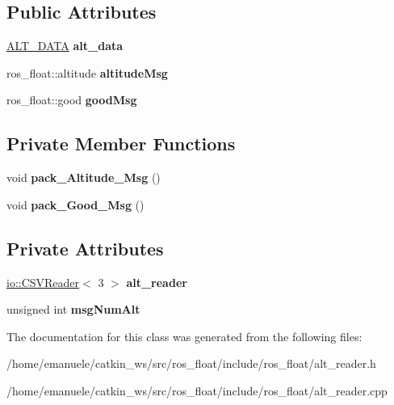 \subsection*{Public Attributes}
\begin{DoxyCompactItemize}
\item 
\mbox{\label{classALT__reader_aacaf9a8c099acd10dd53a54ccf564474}} 
\hyperlink{structALT__DATA}{A\+L\+T\+\_\+\+D\+A\+TA} {\bfseries alt\+\_\+data}
\item 
\mbox{\label{classALT__reader_a4aac4f3940c04b29d253b10b9e3549e2}} 
ros\+\_\+float\+::altitude {\bfseries altitude\+Msg}
\item 
\mbox{\label{classALT__reader_a9d872dde321d76b2c95a31904b05d2ce}} 
ros\+\_\+float\+::good {\bfseries good\+Msg}
\end{DoxyCompactItemize}
\subsection*{Private Member Functions}
\begin{DoxyCompactItemize}
\item 
\mbox{\label{classALT__reader_a99f7700211409858f0989be46f13fb3d}} 
void {\bfseries pack\+\_\+\+Altitude\+\_\+\+Msg} ()
\item 
\mbox{\label{classALT__reader_ae28a3371b576983838ea727537967320}} 
void {\bfseries pack\+\_\+\+Good\+\_\+\+Msg} ()
\end{DoxyCompactItemize}
\subsection*{Private Attributes}
\begin{DoxyCompactItemize}
\item 
\mbox{\label{classALT__reader_afd2086e0508a80c7c409571b9dbf3449}} 
\hyperlink{classio_1_1CSVReader}{io\+::\+C\+S\+V\+Reader}$<$ 3 $>$ {\bfseries alt\+\_\+reader}
\item 
\mbox{\label{classALT__reader_a9086f22999868ee6843955edcd23c708}} 
unsigned int {\bfseries msg\+Num\+Alt}
\end{DoxyCompactItemize}


The documentation for this class was generated from the following files\+:\begin{DoxyCompactItemize}
\item 
/home/emanuele/catkin\+\_\+ws/src/ros\+\_\+float/include/ros\+\_\+float/alt\+\_\+reader.\+h\item 
/home/emanuele/catkin\+\_\+ws/src/ros\+\_\+float/include/ros\+\_\+float/alt\+\_\+reader.\+cpp\end{DoxyCompactItemize}

